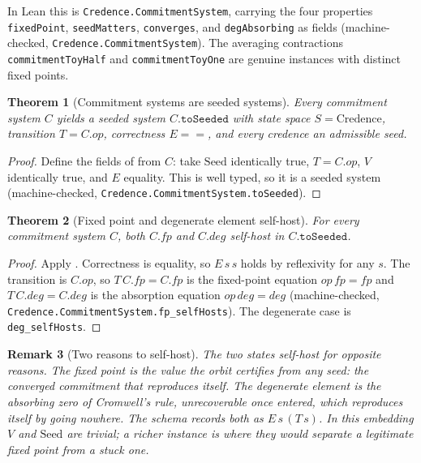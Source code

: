\documentclass[11pt,a4paper]{article}
\newtheorem{theorem}{Theorem}[section]
\newtheorem{remark}[theorem]{Remark}
\newcommand{\Seed}{\mathrm{Seed}}
\begin{document}
In Lean this is \texttt{Credence.CommitmentSystem}, carrying the four
properties \texttt{fixedPoint}, \texttt{seedMatters}, \texttt{converges}, and
\texttt{degAbsorbing} as fields
(machine-checked, \texttt{Credence.CommitmentSystem}).
The averaging contractions \texttt{commitmentToyHalf} and
\texttt{commitmentToyOne} are genuine instances with distinct fixed points.

\begin{theorem}[Commitment systems are seeded systems]
\label{thm:commit-embed}
Every commitment system $C$ yields a seeded system $C.\mathtt{toSeeded}$ with
state space $S = \mathrm{Credence}$, transition $T = C.op$, correctness
$E = {=}$, and every credence an admissible seed.
\end{theorem}

\begin{proof}
Define the fields of  from $C$: take $\Seed$ identically true,
$T = C.op$, $V$ identically true, and $E$ equality.
This is well typed, so it is a seeded system
(machine-checked, \texttt{Credence.CommitmentSystem.toSeeded}).
\end{proof}

\begin{theorem}[Fixed point and degenerate element self-host]
\label{thm:commit-selfhost}
For every commitment system $C$, both $C.fp$ and $C.deg$ self-host in
$C.\mathtt{toSeeded}$.
\end{theorem}

\begin{proof}
Apply .
Correctness is equality, so $E\,s\,s$ holds by reflexivity for any $s$.
The transition is $C.op$, so $T\,C.fp = C.fp$ is the fixed-point equation
$op\,fp = fp$ and $T\,C.deg = C.deg$ is the absorption equation
$op\,deg = deg$
(machine-checked, \texttt{Credence.CommitmentSystem.fp\_selfHosts}).
The degenerate case is \texttt{deg\_selfHosts}.
\end{proof}

\begin{remark}[Two reasons to self-host]
\label{rem:two-reasons}
The two states self-host for opposite reasons.
The fixed point is the value the orbit certifies from any seed: the converged
commitment that reproduces itself.
The degenerate element is the absorbing zero of Cromwell's rule, unrecoverable
once entered, which reproduces itself by going nowhere.
The schema records both as $E\,s\,(T\,s)$.
In this embedding $V$ and $\Seed$ are trivial; a richer instance is where they
would separate a legitimate fixed point from a stuck one.
\end{remark}
\end{document}
